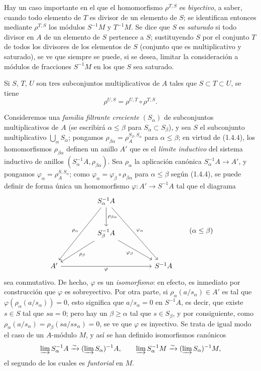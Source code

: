 \begin{env}[1.4.3]
\label{0.1.4.3-fr}
Hay un caso importante en el que el homomorfismo $\rho^{T,S}$ es \emph{biyectivo}, a saber, cuando todo elemento de $T$ es divisor de un elemento de $S$; se identifican entonces mediante $\rho^{T,S}$ los módulos $S^{-1}M$ y $T^{-1}M$.
Se dice que $S$ es \emph{saturado} si todo divisor en $A$ de un elemento de $S$ pertenece a $S$; sustituyendo $S$ por el conjunto $T$ de todos los divisores de los elementos de $S$ (conjunto que es multiplicativo y saturado), se ve que siempre se puede, si se desea, limitar la consideración a módulos de fracciones $S^{-1}M$ en los que $S$ sea saturado.
\end{env}

\begin{env}[1.4.4]
\label{0.1.4.4-fr}
Si $S$, $T$, $U$ son tres subconjuntos multiplicativos de $A$ tales que $S\subset T\subset U$, se tiene
\[
  \rho^{U,S}=\rho^{U,T}\circ\rho^{T,S}.
\]
\end{env}

\begin{env}[1.4.5]
\label{0.1.4.5-fr}
Consideremos una \emph{familia filtrante creciente} $(S_\alpha)$ de subconjuntos multiplicativos de $A$ (se escribirá $\alpha\leq\beta$ para $S_\alpha\subset S_\beta$), y sea $S$ el subconjunto multiplicativo $\bigcup_\alpha S_\alpha$; pongamos
$\rho_{\beta\alpha}=\rho_A^{S_\beta,S_\alpha}$ para $\alpha\leq\beta$;
en virtud de (1.4.4), los homomorfismos $\rho_{\beta\alpha}$ definen un anillo $A'$ que es el \emph{límite inductivo} del sistema inductivo de anillos $(S_\alpha^{-1}A,\rho_{\beta\alpha})$.
Sea $\rho_\alpha$ la aplicación canónica $S_\alpha^{-1}A\to A'$, y pongamos $\varphi_\alpha=\rho_A^{S,S_\alpha}$; como $\varphi_\alpha=\varphi_\beta\circ\rho_{\beta\alpha}$ para $\alpha\leq\beta$ según (1.4.4), se puede definir de forma única un homomorfismo $\varphi:A'\to S^{-1}A$ tal que el diagrama
\[
\begin{tikzcd}[column sep=huge,row sep=large]
  & S_\alpha^{-1}A
      \arrow[ddl,"\rho_\alpha"']
      \arrow[d,"\rho_{\beta\alpha}"]
      \arrow[ddr,"\varphi_\alpha"] & \\
  & S_\beta^{-1}A
      \arrow[dl,"\rho_\beta"]
      \arrow[dr,"\varphi_\beta"'] & \\
A' \arrow[rr,"\varphi"'] & & S^{-1}A
\end{tikzcd}
\qquad(\alpha\leq\beta)
\]
sea conmutativo.
De hecho, $\varphi$ es un \emph{isomorfismo}: en efecto, es inmediato por construcción que $\varphi$ es sobreyectivo.
Por otra parte, si $\rho_\alpha(a/s_\alpha)\in A'$ es tal que $\varphi(\rho_\alpha(a/s_\alpha))=0$, esto significa que $a/s_\alpha=0$ en $S^{-1}A$, es decir, que existe $s\in S$ tal que $sa=0$; pero hay un $\beta\geq\alpha$ tal que $s\in S_\beta$, y por consiguiente, como $\rho_\alpha(a/s_\alpha)=\rho_\beta(sa/ss_\alpha)=0$, se ve que $\varphi$ es inyectivo.
Se trata de igual modo el caso de un $A$-módulo $M$, y así se han definido isomorfismos canónicos
\[
  \varinjlim S_\alpha^{-1}A\xrightarrow{\sim}
  (\varinjlim S_\alpha)^{-1}A,
  \qquad
  \varinjlim S_\alpha^{-1}M\xrightarrow{\sim}
  (\varinjlim S_\alpha)^{-1}M,
\]
el segundo de los cuales es \emph{funtorial} en $M$.
\end{env}

